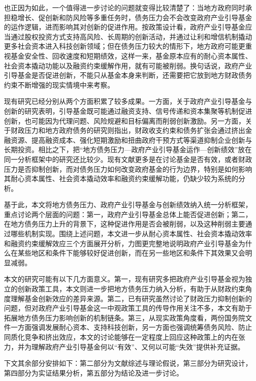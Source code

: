 \documentclass[UTF8,a4paper,zihao=5,fontset=fandol]{ctexart}
\begin{document}
也正因为如此，一个值得进一步讨论的问题就变得比较清楚了：当地方政府同时承担稳增长、促创新和防风险等多重任务时，债务压力会不会改变政府产业引导基金的运作逻辑，进而影响其对创新的促进作用。按政策设计看，政府产业引导基金应当通过股权投资方式支持高风险、长周期的创新活动，并通过让利和增信机制撬动更多社会资本进入科技创新领域；但在债务压力较大的情形下，地方政府可能更重视基金安全性、回收速度和短期绩效，这样一来，基金原本应有的耐心资本属性、社会资本撬动功能以及融资约束缓解作用，就有可能被削弱。换句话说，政府产业引导基金是否促进创新，不能只从基金本身来判断，还需要把它放到地方财政债务约束不断增强的现实情境中来考察。

现有研究已经分别从两个方面积累了较多成果。一方面，关于政府产业引导基金与创新的研究表明，引导基金既可能通过融资支持、信号传递和资本集聚等机制促进创新，也可能因为代理问题、风险规避和目标偏离而削弱创新激励。另一方面，关于财政压力和地方政府债务的研究则指出，财政收支约束和债务扩张会通过挤出金融资源、提高融资成本、强化短期激励和扭曲政府干预方式等渠道抑制企业创新与长期投资。相比之下，把“地方债务压力—政府产业引导基金运作—创新绩效”放在同一分析框架中的研究还比较少。现有文献更多是在讨论基金是否有效，或者财政压力是否抑制创新，而对债务压力如何改变政府基金的行为边界，特别是如何影响其耐心资本属性、社会资本撬动效率和融资约束缓解功能，仍缺少较为系统的分析。

基于此，本文将地方债务压力、政府产业引导基金与创新绩效纳入统一分析框架，重点讨论两个层面的问题：第一，政府产业引导基金总体上能否促进创新；第二，在地方债务压力上升的背景下，这种促进作用是否会被削弱，以及这种削弱主要通过哪些机制实现。围绕上述问题，本文进一步从耐心资本属性、社会资本撬动效率和融资约束缓解效应三个方面展开分析，力图更完整地说明政府产业引导基金为什么在某些地区和条件下能够较好促进创新，而在另一些地区和条件下其效果又会明显减弱。

本文的研究可能有以下几方面意义。第一，现有研究多把政府产业引导基金视为独立的创新政策工具，本文则进一步把地方债务压力纳入分析，有助于从财政约束角度理解基金创新效应的差异来源。第二，已有研究虽然讨论了财政压力抑制创新的问题，但对政府产业引导基金这一中观政策工具的传导作用关注不多，本文有助于拓展地方债务压力影响创新的机制链条。第三，从现实政策角度看，两份国务院文件一方面强调发展耐心资本、支持科技创新，另一方面也强调统筹债务风险、防止同质化竞争和挤出效应，本文的讨论能够在一定程度上回应这种政策上的内在张力，并为理解政府产业引导基金何以“有效”、又何以可能“失效”提供补充证据。

下文其余部分安排如下：第二部分为文献综述与理论假说，第三部分为研究设计，第四部分为实证结果分析，第五部分为结论及进一步讨论。
\end{document}
